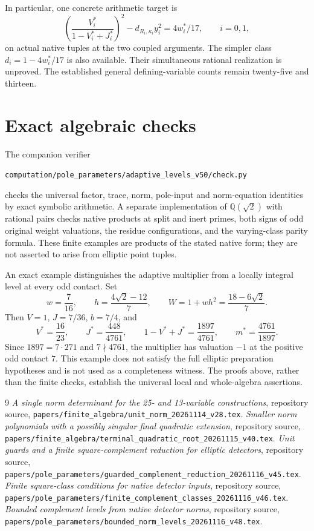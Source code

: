 \documentclass[11pt,a4paper]{article}
\theoremstyle{definition}\newtheorem{definition}[theorem]{Definition}
\newcommand{\Q}{\mathbb Q}\newcommand{\Z}{\mathbb Z}
\begin{document}
In particular, one concrete arithmetic target is
\[
 \left(\frac{V_i^*}{1-V_i^*+J_i^*}\right)^2
       -d_{R_i,\kappa_i}y_i^2=4w_i^*/17,
                         \qquad i=0,1,
\]
on actual native tuples at the two coupled arguments. The simpler
class $d_i=1-4w_i^*/17$ is also available. Their simultaneous rational
realization is unproved. The established
general defining-variable counts remain twenty-five and thirteen.

\section{Exact algebraic checks}

The companion verifier
\begin{center}\small
\texttt{computation/pole\_parameters/adaptive\_levels\_v50/check.py}
\end{center}
checks the universal factor, trace, norm, pole-input and norm-equation
identities by exact symbolic arithmetic. A separate implementation of
$\Q(\sqrt2)$ with rational pairs checks native products at split and
inert primes, both signs of odd original weight valuations, the residue
configurations, and the varying-class parity formula. These finite
examples are products of the stated native form; they are not asserted
to arise from elliptic point tuples.

An exact example distinguishes the adaptive multiplier from a locally
integral level at every odd contact. Set
\[
 w=\frac7{16},\qquad h=\frac{4\sqrt2-12}{7},\qquad
 W=1+wh^2=\frac{18-6\sqrt2}{7}.
\]
Then $V=1$, $J=7/36$, $b=7/4$, and
\[
 V^*=\frac{16}{23},\qquad J^*=\frac{448}{4761},\qquad
 1-V^*+J^*=\frac{1897}{4761},\qquad
 m^*=\frac{4761}{1897}.
\]
Since $1897=7\cdot271$ and $7\nmid4761$, the multiplier has
valuation $-1$ at the positive odd contact $7$. This example does not
satisfy the full elliptic preparation hypotheses and is not used as a
completeness witness. The proofs above, rather than the finite checks,
establish the universal local and whole-algebra assertions.

\begin{thebibliography}{9}
\emph{A single norm determinant for the 25- and 13-variable constructions},
repository source,
\nolinkurl{papers/finite_algebra/unit_norm_20261114_v28.tex}.
\emph{Smaller norm polynomials with a possibly singular final quadratic extension},
repository source,
\nolinkurl{papers/finite_algebra/terminal_quadratic_root_20261115_v40.tex}.
\emph{Unit guards and a finite square-complement reduction for elliptic detectors},
repository source,
\nolinkurl{papers/pole_parameters/guarded_complement_reduction_20261116_v45.tex}.
\emph{Finite square-class conditions for native detector inputs},
repository source,
\nolinkurl{papers/pole_parameters/finite_complement_classes_20261116_v46.tex}.
\emph{Bounded complement levels from native detector norms},
repository source,
\nolinkurl{papers/pole_parameters/bounded_norm_levels_20261116_v48.tex}.
\end{thebibliography}
\end{document}
